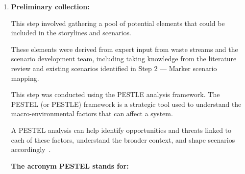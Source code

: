 \begin{enumerate}
  \item \textbf{Preliminary collection:}

        This step involved gathering a pool of potential elements that could be included in the storylines and scenarios.


        These elements were derived from expert input from waste streams and the scenario development team, including taking knowledge from the literature review and existing scenarios identified in Step 2 --- Marker scenario mapping.
        \vspace{\baselineskip}

        This step was conducted using the PESTLE analysis framework. The PESTEL (or PESTLE) framework is a strategic tool used to understand the macro-environmental factors that can affect a system.

        A PESTEL analysis can help identify opportunities and threats linked to each of these factors, understand the broader context, and shape scenarios accordingly~\cite{kokkinos2023methodspestel,sansa2021methodspestel}.

        \vspace{\baselineskip}

        \textbf{The acronym PESTEL stands for:}

\end{enumerate}
